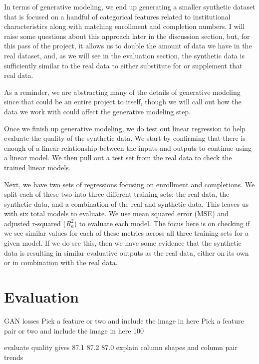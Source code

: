 \documentclass[sigconf, authorversion, nonacm]{acmart}
\begin{document}
        In terms of generative modeling, we end up generating a smaller synthetic dataset that is focused on a handful of categorical features related to institutional characteristics along with matching enrollment and completion numbers. I will raise some questions about this approach later in the discussion section, but, for this pass of the project, it allows us to double the amount of data we have in the real dataset, and, as we will see in the evaluation section, the synthetic data is sufficiently similar to the real data to either substitute for or supplement that real data.

        As a reminder, we are abstracting many of the details of generative modeling since that could be an entire project to itself, though we will call out how the data we work with could affect the generative modeling step.

        Once we finish up generative modeling, we do test out linear regression to help evaluate the quality of the synthetic data. We start by confirming that there is enough of a linear relationship between the inputs and outputs to continue using a linear model. We then pull out a test set from the real data to check the trained linear models.

        Next, we have two sets of regressions focusing on enrollment and completions. We split each of these two into three different training sets: the real data, the synthetic data, and a combination of the real and synthetic data. This leaves us with six total models to evaluate. We use mean squared error (MSE) and adjusted r-squared ($R^2_a$) to evaluate each model. The focus here is on checking if we see similar values for each of these metrics across all three training sets for a given model. If we do see this, then we have some evidence that the synthetic data is resulting in similar evaluative outputs as the real data, either on its own or in combination with the real data.

\section{Evaluation}

    GAN losses
    Pick a feature or two and include the image in here
    Pick a feature pair or two and include the image in here
    100%

    evaluate quality gives 87.1%
    87.2%
    87.0%
    explain column shapes and column pair trends
\end{document}

